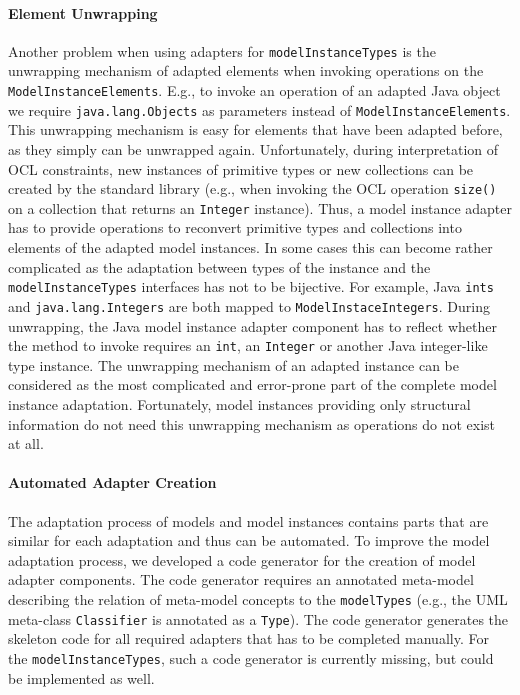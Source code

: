 	\paragraph{Element Unwrapping}
	Another problem when using adapters for \texttt{model\-Instance\-Types} 
	is the unwrapping mechanism of adapted elements when invoking operations 
	on the \texttt{Model\-Instance\-Elements}. E.g., to invoke an operation of an adapted Java 
	object we require \texttt{java.lang.Objects} as parameters instead of 
	\texttt{Model\-Instance\-Elements}. This unwrapping mechanism is easy 
	for elements that have been adapted before, as they simply can be unwrapped 
	again. Unfortunately, during interpretation of OCL constraints, 
	new instances of primitive types or new collections can be created 
	by the standard library (e.g., when invoking the OCL operation \texttt{size()} on a collection that 
	returns an \texttt{Integer} instance). Thus, a 
	model instance adapter has to provide operations to reconvert 
	primitive types and collections into elements of the adapted model 
	instances. In some cases this can become rather complicated as 
	the adaptation between types of the instance and the \texttt{model\-Instance\-Types} interfaces has not to be bijective. For 
	example, Java \texttt{ints} and \texttt{java.lang.Integers} are 
	both mapped to \texttt{ModelInstaceIntegers}. During unwrapping, 
	the Java model instance adapter component has to reflect 
	whether the method to invoke requires an \texttt{int}, an 
	\texttt{Integer} or another Java integer-like type instance.
	The unwrapping mechanism of an adapted instance 
	can be considered as the most complicated and error-prone part 
	of the complete model instance adaptation.
	Fortunately, model instances providing only structural information do not
	need this unwrapping mechanism as operations do not exist at all.

	\paragraph{Automated Adapter Creation}
	The adaptation process of models and model 
	instances contains parts that are similar 
	for each adaptation and thus can be automated.
	To improve the model adaptation process, we developed a code generator 
	for the creation of model adapter components. The code 
	generator requires an annotated meta-model describing
	the relation of meta-model concepts to the \texttt{model\-Types} (e.g., the UML meta-class
	\texttt{Classifier} is annotated as a \texttt{Type}). 
	The code generator generates the skeleton code for all required 
	adapters that has to be completed manually.
	For the \texttt{model\-Instance\-Types}, such a code generator is currently 
	missing, but could be implemented as well.
	
